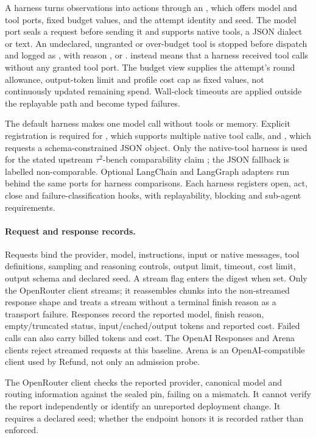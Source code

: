 A harness turns observations into actions through an
, which offers model and tool ports, fixed budget
values, and the attempt identity and seed. The model port seals a
request before sending it and supports native tools, a JSON dialect or
text. An undeclared, ungranted or over-budget tool is stopped before
dispatch and logged as , with reason
,  or
.  instead means
that a harness received tool calls without any granted tool port.
The budget view supplies the attempt's round allowance, output-token
limit and profile cost cap as fixed values, not continuously updated
remaining spend. Wall-clock timeouts are applied outside the
replayable path and become typed failures.

The default  harness makes one model call without
tools or memory. Explicit registration is required for
, which supports multiple native tool calls,
and , which requests a schema-constrained JSON
object. Only the native-tool harness is used for the stated upstream
$\tau^2$-bench comparability claim \citep{barres2025tau2}; the JSON
fallback is labelled non-comparable. Optional LangChain and LangGraph
adapters run behind the same ports for harness comparisons. Each
harness registers open, act, close and failure-classification hooks,
with replayability, blocking and sub-agent requirements.

\paragraph{Request and response records.}
Requests bind the provider, model, instructions, input or native
messages, tool definitions, sampling and reasoning controls, output
limit, timeout, cost limit, output schema and declared seed. A stream
flag enters the digest when set. Only the OpenRouter client streams;
it reassembles chunks into the non-streamed response shape and treats
a stream without a terminal finish reason as a transport failure.
Responses record the reported model, finish reason, empty/truncated
status, input/cached/output tokens and reported cost. Failed calls can
also carry billed tokens and cost. The OpenAI Responses and Arena
clients reject streamed requests at this baseline. Arena is an
OpenAI-compatible client used by Refund, not only an admission probe.

The OpenRouter client checks the reported provider, canonical model and
routing information against the sealed pin, failing on a mismatch. It
cannot verify the report independently or identify an unreported
deployment change. It requires a declared seed; whether the endpoint
honors it is recorded rather than enforced.

